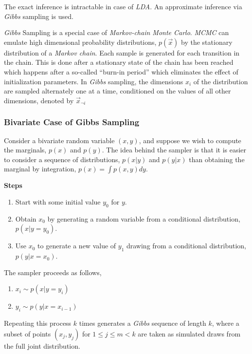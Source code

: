 The exact inference is intractable in case of \textit{LDA}. An approximate inference via \textit{Gibbs} sampling is used. 

\par
\textit{Gibbs} Sampling \citep*{walsh2004markov} is a special case of \textit{Markov-chain Monte Carlo}. \textit{MCMC} can emulate high dimensional probability
distributions, \(p(\vec{x})\) by the stationary distribution of a \textit{Markov chain}. Each sample is generated for each transition in 
the chain. This is done after a stationary state of the chain has been reached which happens after a so-called ``burn-in period'' which 
eliminates the effect of initialization parameters. In \textit{Gibbs} sampling, the dimensions \(x_i\) of the distribution are sampled
alternately one at a time, conditioned on the values of all other dimensions, denoted by \(\vec{x}_{ \neg i}\)

\subsubsection*{Bivariate Case of Gibbs Sampling}

\par
Consider a bivariate random variable \((x,y)\), and suppose we wish to compute the marginals, \(p(x)\) and \(p(y)\). The idea behind the
sampler is that it is easier to consider a sequence of distributions, \(p(x|y)\) and \(p(y|x)\) than obtaining the marginal by integration,
\(p(x) = \int p(x,y) dy\).

\textbf{Steps}

\begin{enumerate}
 \item Start with some initial value \(y_0\) for \(y\).
 \item Obtain \(x_0\) by generating a random variable from a conditional distribution, \(p(x|y=y_0)\).
 \item Use \(x_0\) to generate a new value of \(y_1\) drawing from a conditional distribution, \(p(y|x=x_0)\).
\end{enumerate}

The sampler proceeds as follows, 

\begin{enumerate}
 \item \(x_i \sim p(x|y=y_i)\)
 \item \(y_i \sim p(y|x=x_{i-1})\)
\end{enumerate}

Repeating this process \(k\) times generates a \textit{Gibbs} sequence of length \(k\), where a subset of points \((x_j,y_j)\) for 
\(1 \leq j \leq m < k\) are taken as simulated draws from the full joint distribution.

